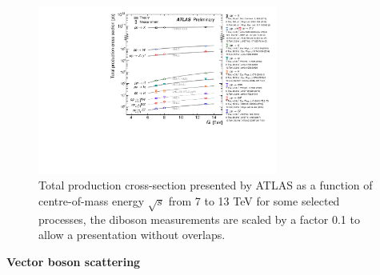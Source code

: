 \begin{figure}[!htb]
  \centering
  \includegraphics[width=0.7\textwidth]{figures/Theory/ATLAS_n_SMSummary_SqrtS.pdf}
  \caption{Total production cross-section presented by ATLAS as a function of centre-of-mass energy $\sqrt{s}$ from 7 to 13 TeV for some selected processes,
	   the diboson measurements are scaled by a factor 0.1 to allow a presentation without overlaps.}
  \label{fig:diboson_xs1}
\end{figure}

\textbf{Vector boson scattering}

